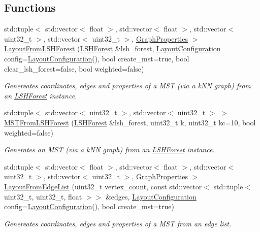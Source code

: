 \subsection*{Functions}
\begin{DoxyCompactItemize}
\item 
std\+::tuple$<$ std\+::vector$<$ float $>$, std\+::vector$<$ float $>$, std\+::vector$<$ uint32\+\_\+t $>$, std\+::vector$<$ uint32\+\_\+t $>$, \hyperlink{structGraphProperties}{Graph\+Properties} $>$ \hyperlink{layout_8hh_aa004fd999aac084ce1a95e81c2a6336c}{Layout\+From\+L\+S\+H\+Forest} (\hyperlink{classLSHForest}{L\+S\+H\+Forest} \&lsh\+\_\+forest, \hyperlink{structLayoutConfiguration}{Layout\+Configuration} config=\hyperlink{structLayoutConfiguration}{Layout\+Configuration}(), bool create\+\_\+mst=true, bool clear\+\_\+lsh\+\_\+forest=false, bool weighted=false)
\begin{DoxyCompactList}\small\item\em Genereates coordinates, edges and properties of a M\+ST (via a k\+NN graph) from an \hyperlink{classLSHForest}{L\+S\+H\+Forest} instance. \end{DoxyCompactList}\item 
std\+::tuple$<$ std\+::vector$<$ uint32\+\_\+t $>$, std\+::vector$<$ uint32\+\_\+t $>$ $>$ \hyperlink{layout_8hh_a34d2f2c07e0aec50114d3523fd0da251}{M\+S\+T\+From\+L\+S\+H\+Forest} (\hyperlink{classLSHForest}{L\+S\+H\+Forest} \&lsh\+\_\+forest, uint32\+\_\+t k, uint32\+\_\+t kc=10, bool weighted=false)
\begin{DoxyCompactList}\small\item\em Generates an M\+ST (via a k\+NN graph) from an \hyperlink{classLSHForest}{L\+S\+H\+Forest} instance. \end{DoxyCompactList}\item 
std\+::tuple$<$ std\+::vector$<$ float $>$, std\+::vector$<$ float $>$, std\+::vector$<$ uint32\+\_\+t $>$, std\+::vector$<$ uint32\+\_\+t $>$, \hyperlink{structGraphProperties}{Graph\+Properties} $>$ \hyperlink{layout_8hh_a287eac7d9621f833da1f42c06a9cd431}{Layout\+From\+Edge\+List} (uint32\+\_\+t vertex\+\_\+count, const std\+::vector$<$ std\+::tuple$<$ uint32\+\_\+t, uint32\+\_\+t, float $>$$>$ \&edges, \hyperlink{structLayoutConfiguration}{Layout\+Configuration} config=\hyperlink{structLayoutConfiguration}{Layout\+Configuration}(), bool create\+\_\+mst=true)
\begin{DoxyCompactList}\small\item\em Genereates coordinates, edges and properties of a M\+ST from an edge list. \end{DoxyCompactList}\item 
$$
\end{DoxyCompactItemize}
